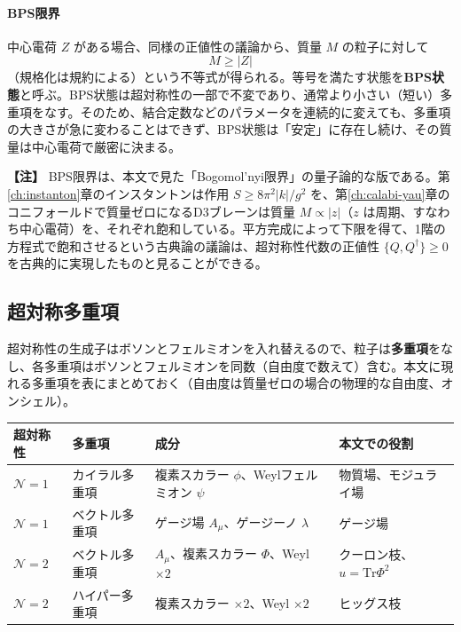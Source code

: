 \documentclass[uplatex, dvipdfmx, book]{jsbook}
\let\origsubsection\subsection
\let\origsubsubsection\subsubsection
\renewcommand{\section}{\origsubsection}
\renewcommand{\subsection}{\origsubsubsection}
\renewcommand{\subsubsection}{\paragraph}
\newenvironment{note}{\vspace{1ex}\par\footnotesize\noindent\textbf{【注】}}{\par\vspace{1ex}}
\begin{document}
\paragraph{BPS限界}
中心電荷 $Z$ がある場合、同様の正値性の議論から、質量 $M$ の粒子に対して
\begin{equation}
    M \ge |Z|
\end{equation}
（規格化は規約による）という不等式が得られる。等号を満たす状態を\textbf{BPS状態}と呼ぶ。BPS状態は超対称性の一部で不変であり、通常より小さい（短い）多重項をなす。そのため、結合定数などのパラメータを連続的に変えても、多重項の大きさが急に変わることはできず、BPS状態は「安定」に存在し続け、その質量は中心電荷で厳密に決まる。

\begin{note}
BPS限界は、本文で見た「Bogomol'nyi限界」の量子論的な版である。第\ref{ch:instanton}章のインスタントンは作用 $S \ge 8\pi^2|k|/g^2$ を、第\ref{ch:calabi-yau}章のコニフォールドで質量ゼロになるD3ブレーンは質量 $M \propto |z|$（$z$ は周期、すなわち中心電荷）を、それぞれ飽和している。平方完成によって下限を得て、1階の方程式で飽和させるという古典論の議論は、超対称性代数の正値性 $\{Q, Q^\dagger\} \ge 0$ を古典的に実現したものと見ることができる。
\end{note}

\section{超対称多重項}

超対称性の生成子はボソンとフェルミオンを入れ替えるので、粒子は\textbf{多重項}をなし、各多重項はボソンとフェルミオンを同数（自由度で数えて）含む。本文に現れる多重項を表にまとめておく（自由度は質量ゼロの場合の物理的な自由度、オンシェル）。

\begin{center}\small\setlength{\tabcolsep}{4pt}
\begin{tabular}{llll}
    \hline
    超対称性 & 多重項 & 成分 & 本文での役割 \\
    \hline
    $\mathcal{N} = 1$ & カイラル多重項 & 複素スカラー $\phi$、Weylフェルミオン $\psi$ & 物質場、モジュライ場 \\
    $\mathcal{N} = 1$ & ベクトル多重項 & ゲージ場 $A_\mu$、ゲージーノ $\lambda$ & ゲージ場 \\
    $\mathcal{N} = 2$ & ベクトル多重項 & $A_\mu$、複素スカラー $\Phi$、Weyl $\times 2$ & クーロン枝、$u = \mathrm{Tr}\Phi^2$ \\
    $\mathcal{N} = 2$ & ハイパー多重項 & 複素スカラー $\times 2$、Weyl $\times 2$ & ヒッグス枝 \\
    \hline
\end{tabular}
\end{center}
\end{document}
